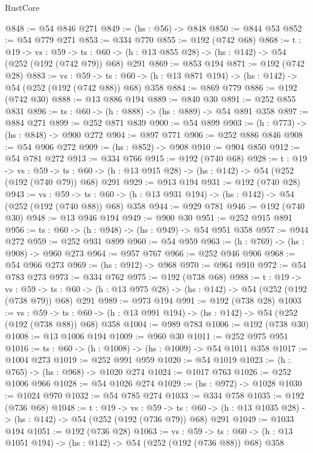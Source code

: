 \begin{lexlean}{RustCore}
\begin{coremodule}
@848 := @54 @846 @271
@849 := (hs : @56) -> @848
@850 := @844 @53
@852 := @54 @779 @271
@853 := @334 @770
@855 := @192 (@742 @68)
@868 := {t : @19} ->
  {vs : @59} ->
  {ts : @60} -> (h : @13 @855 @28) -> (hs : @142) -> @54 (@252 (@192 (@742 @79)) @68) @291
@869 := @853 @194
@871 := @192 (@742 @28)
@883 := {vs : @59} ->
  {ts : @60} -> (h : @13 @871 @194) -> (hs : @142) -> @54 (@252 (@192 (@742 @88)) @68) @358
@884 := @869 @779
@886 := @192 (@742 @30)
@888 := @13 @886 @194
@889 := @840 @30
@891 := @252 @855 @831
@896 := {ts : @60} -> (h : @888) -> (hs : @889) -> @54 @891 @358
@897 := @884 @271
@899 := @252 @871 @839
@900 := @54 @899
@903 := (h : @773) -> (hs : @848) -> @900 @272
@904 := @897 @771
@906 := @252 @886 @846
@908 := @54 @906 @272
@909 := (hs : @852) -> @908
@910 := @904 @850
@912 := @54 @781 @272
@913 := @334 @766
@915 := @192 (@740 @68)
@928 := {t : @19} ->
  {vs : @59} ->
  {ts : @60} -> (h : @13 @915 @28) -> (hs : @142) -> @54 (@252 (@192 (@740 @79)) @68) @291
@929 := @913 @194
@931 := @192 (@740 @28)
@943 := {vs : @59} ->
  {ts : @60} -> (h : @13 @931 @194) -> (hs : @142) -> @54 (@252 (@192 (@740 @88)) @68) @358
@944 := @929 @781
@946 := @192 (@740 @30)
@948 := @13 @946 @194
@949 := @900 @30
@951 := @252 @915 @891
@956 := {ts : @60} -> (h : @948) -> (hs : @949) -> @54 @951 @358
@957 := @944 @272
@959 := @252 @931 @899
@960 := @54 @959
@963 := (h : @769) -> (hs : @908) -> @960 @273
@964 := @957 @767
@966 := @252 @946 @906
@968 := @54 @966 @273
@969 := (hs : @912) -> @968
@970 := @964 @910
@972 := @54 @783 @273
@973 := @334 @762
@975 := @192 (@738 @68)
@988 := {t : @19} ->
  {vs : @59} ->
  {ts : @60} -> (h : @13 @975 @28) -> (hs : @142) -> @54 (@252 (@192 (@738 @79)) @68) @291
@989 := @973 @194
@991 := @192 (@738 @28)
@1003 := {vs : @59} ->
  {ts : @60} -> (h : @13 @991 @194) -> (hs : @142) -> @54 (@252 (@192 (@738 @88)) @68) @358
@1004 := @989 @783
@1006 := @192 (@738 @30)
@1008 := @13 @1006 @194
@1009 := @960 @30
@1011 := @252 @975 @951
@1016 := {ts : @60} -> (h : @1008) -> (hs : @1009) -> @54 @1011 @358
@1017 := @1004 @273
@1019 := @252 @991 @959
@1020 := @54 @1019
@1023 := (h : @765) -> (hs : @968) -> @1020 @274
@1024 := @1017 @763
@1026 := @252 @1006 @966
@1028 := @54 @1026 @274
@1029 := (hs : @972) -> @1028
@1030 := @1024 @970
@1032 := @54 @785 @274
@1033 := @334 @758
@1035 := @192 (@736 @68)
@1048 := {t : @19} ->
  {vs : @59} ->
  {ts : @60} -> (h : @13 @1035 @28) -> (hs : @142) -> @54 (@252 (@192 (@736 @79)) @68) @291
@1049 := @1033 @194
@1051 := @192 (@736 @28)
@1063 := {vs : @59} ->
  {ts : @60} -> (h : @13 @1051 @194) -> (hs : @142) -> @54 (@252 (@192 (@736 @88)) @68) @358

\end{coremodule}
\end{lexlean}
